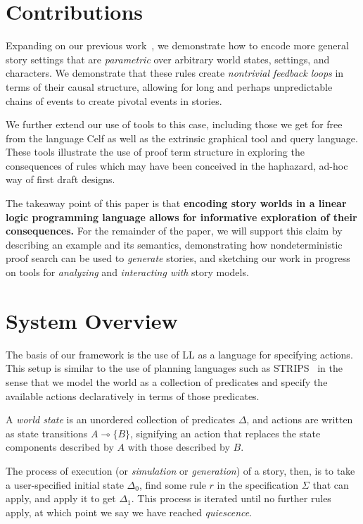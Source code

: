 \documentclass[letterpaper]{article}
\newcommand{\lolli}{\multimap}
\newcommand{\stepsto}{\rightsquigarrow}
\begin{document}
\section{Contributions}

Expanding on our previous work~\cite{Martens13:LPNMR}, we demonstrate how
to encode more general story settings that are {\em parametric} over
arbitrary world states, settings, and characters. We demonstrate that these
rules create {\em nontrivial feedback loops} in terms of their causal
structure, allowing for long and perhaps unpredictable chains of events to
create pivotal events in stories.

We further extend our use of tools to this case, including those we get
for free from the language Celf as well as the extrinsic
graphical tool and query language. These tools illustrate the
use of proof term structure in exploring the consequences of rules which
may have been conceived in the haphazard, ad-hoc way of first draft
designs.

The takeaway point of this paper is that {\bf encoding story worlds in a
linear logic programming language allows for informative exploration of
their consequences.} For the remainder of the paper, we will support this claim by
describing an example and its semantics, demonstrating how
nondeterministic proof search can be used to {\em generate} stories, and
sketching our work in progress on tools for {\em analyzing} and {\em
interacting with} story models.

\section{System Overview}

The basis of our framework is the use of LL as a language for specifying
actions. This setup is similar to the use of planning languages such as
STRIPS~\cite{Fikes1971STRIPS} in the sense that we model the world as a
collection of predicates and specify the available actions declaratively in
terms of those predicates.

A {\em world state} is an unordered collection of
predicates $\Delta$, and actions are written as state transitions $A \lolli
\{B\}$, signifying an action that replaces the state components
described by $A$ with those described by $B$.

The process of execution (or {\em simulation} or {\em generation}) of a
story, then, is to take a user-specified initial state $\Delta_0$, find
some rule $r$ in the specification $\Sigma$ that can apply, and apply it to get
$\Delta_1$. 
This process is iterated until no further rules apply, at which
point we say we have reached {\em quiescence}.
\end{document}
